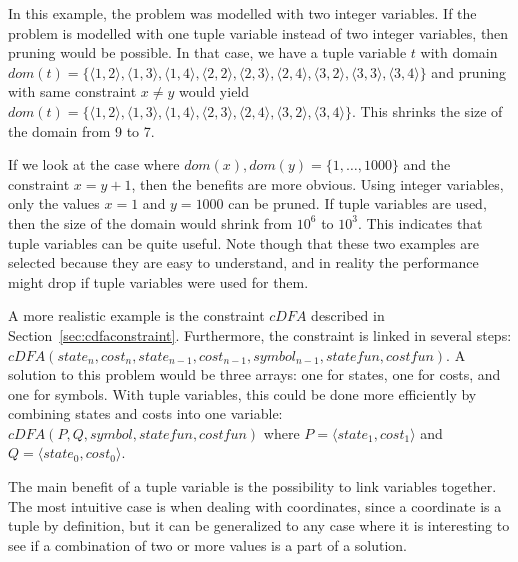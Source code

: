 \documentclass[a4paper,11pt]{article}
\begin{document}
In this example, the problem was modelled with two integer variables. If the problem is modelled with one tuple variable instead of two integer variables, then pruning would be possible. In that case, we have a tuple variable $t$ with domain 
$\mathit{dom}(t)=\{
\langle1,2\rangle,\allowbreak 
\langle1,3\rangle,\allowbreak 
\langle1,4\rangle,\allowbreak
\langle2,2\rangle,\allowbreak
\langle2,3\rangle,\allowbreak
\langle2,4\rangle,\allowbreak
\langle3,2\rangle,\allowbreak
\langle3,3\rangle,\allowbreak
\langle3,4\rangle\}$ 
and pruning with same constraint $x\neq y$ would yield 
$\mathit{dom}(t)=\{
\langle1,2\rangle,\allowbreak
\langle1,3\rangle,\allowbreak
\langle1,4\rangle,\allowbreak
\langle2,3\rangle,\allowbreak
\langle2,4\rangle,\allowbreak
\langle3,2\rangle,\allowbreak
\langle3,4\rangle\}$. 
This shrinks the size of the domain from 9 to 7. 

If we look at the case where $\mathit{dom}(x),\mathit{dom}(y)=\{1,\ldots,1000\}$ and the constraint $x=y+1$, then the benefits are more obvious. Using integer variables, only the values $x=1$ and $y=1000$ can be pruned. If tuple variables are used, then the size of the domain would shrink from $10^6$ to $10^3$. This indicates that tuple variables can be quite useful. Note though that these two examples are selected because they are easy to understand, and in reality the performance might drop if tuple variables were used for them. 

A more realistic example is the constraint $cDFA$ described in Section~\ref{sec:cdfaconstraint}. Furthermore, the constraint is linked in several steps: 
$\mathit{cDFA}(\mathit{state_n}, \allowbreak
\mathit{cost_n},\allowbreak
\mathit{state_{n-1}},\allowbreak
\mathit{cost_{n-1}},\allowbreak
\mathit{symbol_{n-1}},\allowbreak
\mathit{statefun}, \allowbreak
\mathit{costfun})$. 
A solution to this problem would be three arrays: one for states, one for costs, and one for symbols. With tuple variables, this could be done more efficiently by combining states and costs into one variable: 
$\mathit{cDFA}(P, \allowbreak
Q, \allowbreak
\mathit{symbol}, \allowbreak
\mathit{statefun}, \allowbreak
\mathit{costfun})$ 
where 
$P=\langle 
\mathit{state_1}, \allowbreak
\mathit{cost_1} \allowbreak
\rangle$ 
and 
$Q=\langle 
\mathit{state_0}, \allowbreak
\mathit{cost_0} \allowbreak
\rangle$.

The main benefit of a tuple variable is the possibility to link variables together. The most intuitive case is when dealing with coordinates, since a coordinate is a tuple by definition, but it can be generalized to any case where it is interesting to see if a combination of two or more values is a part of a solution. 
\end{document}
